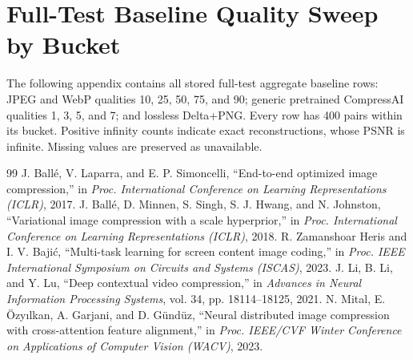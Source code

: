 \documentclass[conference]{IEEEtran}
\begin{document}
\clearpage
\onecolumn
\appendix
\section{Full-Test Baseline Quality Sweep by Bucket}
The following appendix contains all stored full-test aggregate baseline rows: JPEG and WebP qualities 10, 25, 50, 75, and 90; generic pretrained CompressAI qualities 1, 3, 5, and 7; and lossless Delta+PNG. Every row has 400 pairs within its bucket. Positive infinity counts indicate exact reconstructions, whose PSNR is infinite. Missing values are preserved as unavailable.


\begin{thebibliography}{99}
J. Ball\'e, V. Laparra, and E. P. Simoncelli, ``End-to-end optimized image compression,'' in \emph{Proc. International Conference on Learning Representations (ICLR)}, 2017.
J. Ball\'e, D. Minnen, S. Singh, S. J. Hwang, and N. Johnston, ``Variational image compression with a scale hyperprior,'' in \emph{Proc. International Conference on Learning Representations (ICLR)}, 2018.
R. Zamanshoar Heris and I. V. Baji\'c, ``Multi-task learning for screen content image coding,'' in \emph{Proc. IEEE International Symposium on Circuits and Systems (ISCAS)}, 2023.
J. Li, B. Li, and Y. Lu, ``Deep contextual video compression,'' in \emph{Advances in Neural Information Processing Systems}, vol. 34, pp. 18114--18125, 2021.
N. Mital, E. \"Ozy\i lkan, A. Garjani, and D. G\"und\"uz, ``Neural distributed image compression with cross-attention feature alignment,'' in \emph{Proc. IEEE/CVF Winter Conference on Applications of Computer Vision (WACV)}, 2023.
\end{thebibliography}
\end{document}
